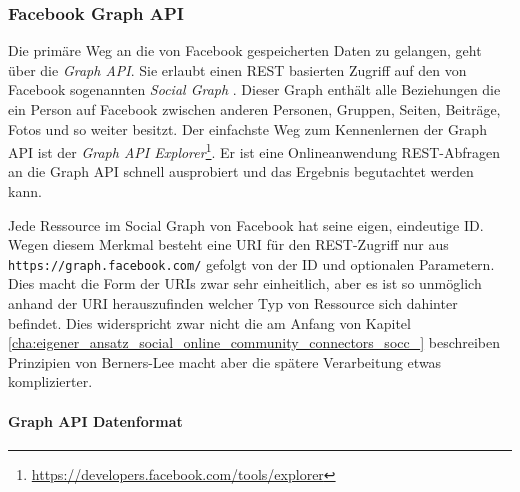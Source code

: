 \subsubsection{Facebook Graph API} %
\label{ssub:facebook_graph_api}

Die primäre Weg an die von Facebook gespeicherten Daten zu gelangen, geht über die \emph{Graph API}. Sie erlaubt einen REST basierten Zugriff auf den von Facebook sogenannten \emph{Social Graph} \cite{FacebookGraphAPI}. Dieser Graph enthält alle Beziehungen die ein Person auf Facebook zwischen anderen Personen, Gruppen, Seiten, Beiträge, Fotos und so weiter besitzt. Der einfachste Weg zum Kennenlernen der Graph API ist der \emph{Graph API Explorer}\footnote{\url{https://developers.facebook.com/tools/explorer}}. Er ist eine Onlineanwendung REST-Abfragen an die Graph API schnell ausprobiert und das Ergebnis begutachtet werden kann.

Jede Ressource im Social Graph von Facebook hat seine eigen, eindeutige ID. Wegen diesem Merkmal besteht eine URI für den REST-Zugriff nur aus \texttt{https://graph.facebook.com/} gefolgt von der ID und optionalen Parametern. Dies macht die Form der URIs zwar sehr einheitlich, aber es ist so unmöglich anhand der URI herauszufinden welcher Typ von Ressource sich dahinter befindet. Dies widerspricht zwar nicht die am Anfang von Kapitel \ref{cha:eigener_ansatz_social_online_community_connectors_socc_} beschreiben Prinzipien von Berners-Lee macht aber die spätere Verarbeitung etwas komplizierter. 

\paragraph{Graph API Datenformat} %
\label{par:graph_api_datenformat}

